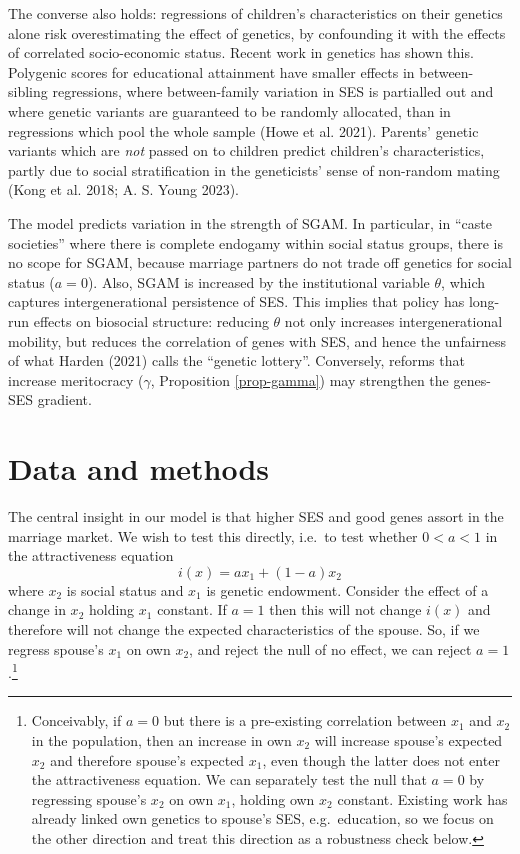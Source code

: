 \documentclass[
  12pt,
]{article}
\theoremstyle{definition}
\theoremstyle{definition}
\theoremstyle{definition}
\theoremstyle{definition}
\theoremstyle{remark}
\begin{document}
The converse also holds: regressions of children's characteristics on their
genetics alone risk overestimating the effect of genetics, by confounding it
with the effects of correlated socio-economic status. Recent work in genetics
has shown this. Polygenic scores for educational attainment have smaller effects
in between-sibling regressions, where between-family variation in SES is
partialled out and where genetic variants are guaranteed to be randomly
allocated, than in regressions which pool the whole sample (Howe et al. 2021).
Parents' genetic variants which are \emph{not} passed on to children predict
children's characteristics, partly due to social stratification in the geneticists'
sense of non-random mating (Kong et al. 2018; A. S. Young 2023).

The model predicts variation in the strength of SGAM. In particular, in
``caste societies'' where there is complete endogamy within social status
groups, there is no scope for SGAM, because marriage partners do not
trade off genetics for social status (\(a = 0\)). Also, SGAM is increased by the
institutional variable \(\theta\), which captures intergenerational persistence of
SES. This implies that policy has long-run effects on biosocial structure: reducing
\(\theta\) not only increases intergenerational mobility, but reduces
the correlation of genes with SES, and hence the unfairness of what
Harden (2021) calls the ``genetic lottery''. Conversely, reforms that
increase meritocracy (\(\gamma\), Proposition \ref{prop-gamma}) may strengthen the
genes-SES gradient.

\hypertarget{data-and-methods}{%
\section{Data and methods}\label{data-and-methods}}

The central insight in our model is that higher SES and good genes assort in the
marriage market. We wish to test this directly, i.e.~to test whether \(0 < a < 1\)
in the attractiveness equation
\[
i(x) = a x_1 + (1-a) x_2
\]
where \(x_2\) is social status and \(x_1\) is genetic endowment. Consider the effect
of a change in \(x_2\) holding \(x_1\) constant. If \(a = 1\) then this will not
change \(i(x)\) and therefore will not change the expected characteristics of the
spouse. So, if we regress spouse's \(x_1\) on own \(x_2\), and reject the null of no
effect, we can reject \(a = 1\).\footnote{Conceivably, if \(a = 0\) but there is a pre-existing correlation
  between \(x_1\) and \(x_2\) in the population, then an increase in own \(x_2\) will
  increase spouse's expected \(x_2\) and therefore spouse's expected \(x_1\), even
  though the latter does not enter the attractiveness equation. We can separately
  test the null that \(a = 0\) by regressing spouse's \(x_2\) on own \(x_1\), holding
  own \(x_2\) constant. Existing work has already linked own genetics to spouse's
  SES, e.g.~education, so we focus on the other direction and treat this direction
  as a robustness check below.}
\end{document}
